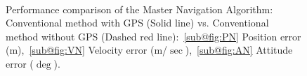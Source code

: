 \documentclass[3p]{elsarticle}
\begin{document}
\begin{figure}[H]
{	}\\
	\caption{%
Performance comparison of the Master Navigation Algorithm: Conventional method with GPS (Solid line) vs. Conventional method without GPS (Dashed red line):~\ref{sub@fig:PN} Position error (m),~\ref{sub@fig:VN} Velocity error (m/\(\sec\)),~\ref{sub@fig:AN} Attitude error (\(\deg\)).
}\label{fig:master_no_ai}
\end{figure}
\end{document}

